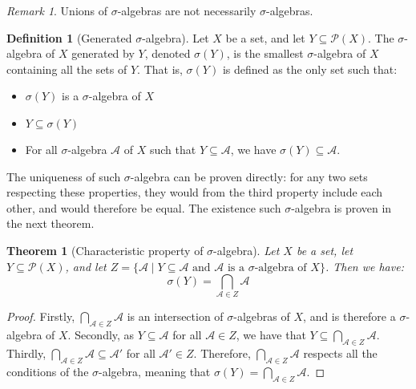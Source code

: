 \documentclass{article}
\newtheorem{theorem}{Theorem}[section]
\theoremstyle{definition}
\newtheorem{definition}{Definition}[section]
\theoremstyle{remark}
\newtheorem*{remark}{Remark}
\theoremstyle{example}
\begin{document}
\begin{remark}
    Unions of $\sigma$-algebras are not necessarily $\sigma$-algebras.
\end{remark}

\begin{definition}[Generated $\sigma$-algebra]
    Let $X$ be a set, and let $Y \subseteq \mathcal{P}(X)$. The $\sigma$-algebra of $X$ generated by $Y$, denoted $\sigma(Y)$, is the smallest $\sigma$-algebra of $X$ containing all the sets of $Y$. That is, $\sigma(Y)$ is defined as the only set such that:
    \begin{itemize}
        \item $\sigma(Y)$ is a $\sigma$-algebra of $X$
        \item $Y \subseteq \sigma(Y)$
        \item For all $\sigma$-algebra $\mathcal{A}$ of $X$ such that $Y \subseteq \mathcal{A}$, we have $\sigma(Y) \subseteq \mathcal{A}$.
    \end{itemize}
    The uniqueness of such $\sigma$-algebra can be proven directly: for any two sets respecting these properties, they would from the third property include each other, and would therefore be equal. The existence such $\sigma$-algebra is proven in the next theorem.
\end{definition}

\begin{theorem}[Characteristic property of $\sigma$-algebra]
    Let $X$ be a set, let $Y \subseteq \mathcal{P}(X)$, and let $Z = \{\mathcal{A} \mid \text{$Y \subseteq \mathcal{A}$ and $\mathcal{A}$ is a $\sigma$-algebra of $X$}\}$. Then we have:
        $$\sigma(Y) = \bigcap_{\mathcal{A} \in Z} \mathcal{A}$$
\end{theorem}

\begin{proof}
    Firstly, $\bigcap_{\mathcal{A} \in Z} \mathcal{A}$ is an intersection of $\sigma$-algebras of $X$, and is therefore a $\sigma$-algebra of $X$. Secondly, as $Y \subseteq \mathcal{A}$ for all $\mathcal{A} \in Z$, we have that $Y \subseteq \bigcap_{\mathcal{A} \in Z} \mathcal{A}$. Thirdly, $\bigcap_{\mathcal{A} \in Z} \mathcal{A} \subseteq \mathcal{A}'$ for all $\mathcal{A}' \in Z$. Therefore, $\bigcap_{\mathcal{A} \in Z} \mathcal{A}$ respects all the conditions of the $\sigma$-algebra, meaning that $\sigma(Y) = \bigcap_{\mathcal{A} \in Z} \mathcal{A}$.
\end{proof}
\end{document}
